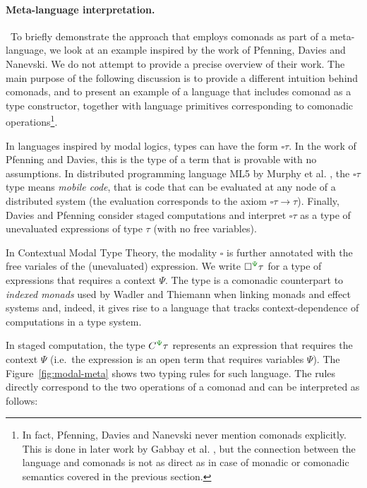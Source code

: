 
\paragraph{Meta-language interpretation.} ~To briefly demonstrate the app\-roach that employs comonads
as part of a meta-language, we look at an example inspired by the work of Pfenning, Davies and 
Nanevski. We do not attempt to provide a precise overview of their work. The main purpose 
of the following discussion is to provide a different intuition behind comonads, and to present an 
example of a language that includes comonad as a type constructor, together with language primitives
corresponding to comonadic operations\footnote{In fact, Pfenning, Davies and Nanevski 
\cite{logic-modal-reconstruction,logic-cmtt} never mention comonads explicitly. This is done in later 
work by Gabbay et al. \cite{logic-cmtt-semantics},  but the connection between the language and comonads
is not as direct as in case of monadic or comonadic semantics covered in the previous section.}. 

In languages inspired by modal logics, types can have the form $\square \tau$. In the work of
Pfenning and Davies, this is the type of a term that is provable with no assumptions. In distributed 
programming language ML5 by Murphy et al. \cite{app-distributed-ml5,logic-distributed-calculus}, the 
$\square \tau$ type means \emph{mobile code}, that is code that can be evaluated at any node of a 
distributed system (the evaluation corresponds to the axiom $\square \tau \rightarrow \tau$). 
Finally, Davies and Pfenning \cite{logic-modal-staged} consider staged computations and interpret 
$\square \tau$ as a type of unevaluated expressions of type $\tau$ (with no free variables).

In Contextual Modal Type Theory, the modality $\square$ is further annotated with the free variales
of the (unevaluated) expression. We write $\square^{\cclrd{\Psi}} \tau$ for a type of expressions
that requires a context $\Psi$. The type is a comonadic counterpart to \emph{indexed monads} used by 
Wadler and Thiemann when linking monads and effect systems and, indeed, it gives rise to a language 
that tracks context-dependence of computations in a type system.

In staged computation, the type $\ctyp{\cclrd{\Psi}}{\tau}$ represents an expression 
that requires the context $\Psi$ (i.e.~the expression is an open term that requires variables $\Psi$).
The Figure~\ref{fig:modal-meta} shows two typing rules for such language. The rules directly
correspond to the two operations of a comonad and can be interpreted as follows:

